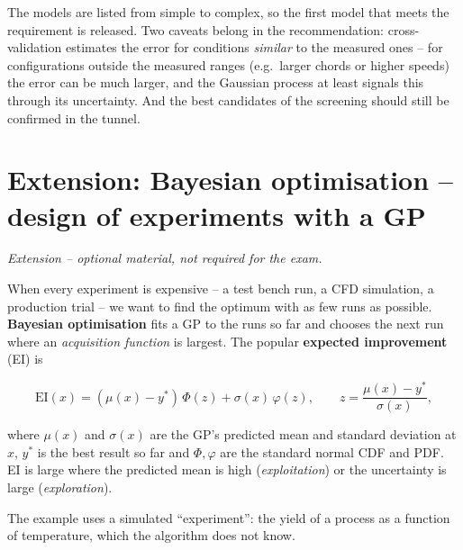 \documentclass[
  letterpaper,
  DIV=11,
  numbers=noendperiod]{scrreprt}
\begin{document}
The models are listed from simple to complex, so the first model that
meets the requirement is released. Two caveats belong in the
recommendation: cross-validation estimates the error for conditions
\emph{similar} to the measured ones -- for configurations outside the
measured ranges (e.g.~larger chords or higher speeds) the error can be
much larger, and the Gaussian process at least signals this through its
uncertainty. And the best candidates of the screening should still be
confirmed in the tunnel.

\section{Extension: Bayesian optimisation -- design of experiments with
a
GP}\label{extension-bayesian-optimisation-design-of-experiments-with-a-gp}

\emph{Extension -- optional material, not required for the exam.}

When every experiment is expensive -- a test bench run, a CFD
simulation, a production trial -- we want to find the optimum with as
few runs as possible. \textbf{Bayesian optimisation} fits a GP to the
runs so far and chooses the next run where an \emph{acquisition
function} is largest. The popular \textbf{expected improvement} (EI) is

\[\text{EI}(x) = (\mu(x) - y^*)\,\Phi(z) + \sigma(x)\,\varphi(z), \qquad z = \frac{\mu(x) - y^*}{\sigma(x)},\]

where \(\mu(x)\) and \(\sigma(x)\) are the GP's predicted mean and
standard deviation at \(x\), \(y^*\) is the best result so far and
\(\Phi, \varphi\) are the standard normal CDF and PDF. EI is large where
the predicted mean is high (\emph{exploitation}) or the uncertainty is
large (\emph{exploration}).

The example uses a simulated ``experiment'': the yield of a process as a
function of temperature, which the algorithm does not know.
\end{document}
